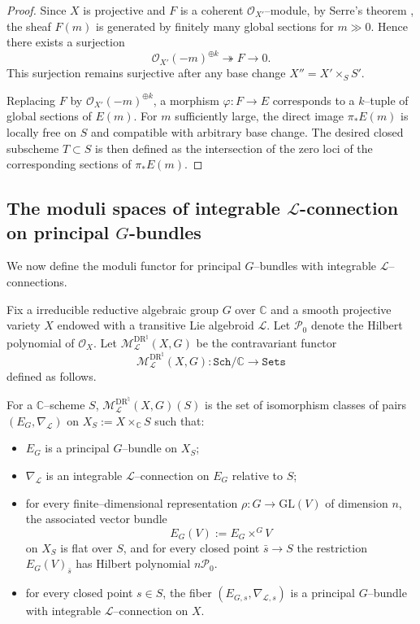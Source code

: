 \documentclass[12pt,reqno]{amsart}
\numberwithin{equation}{subsection}
\theoremstyle{definition}
\theoremstyle{theorem}
\begin{document}
\begin{proof}
	Since $X$ is projective and $F$ is a coherent $\mathcal{O}_{X'}$--module,
	by Serre's theorem \cite[\S\,Ch.~II, Thm.~5.17]{R. Hartshorne-1977},
	the sheaf $F(m)$ is generated by finitely many global sections for $m \gg 0$.
	Hence there exists a surjection
	\[
	\mathcal{O}_{X'}(-m)^{\oplus k} \twoheadrightarrow F \to 0 .
	\]
	This surjection remains surjective after any base change
	$X'' = X' \times_S S'$.
	
	Replacing $F$ by $\mathcal{O}_{X'}(-m)^{\oplus k}$, a morphism
	$\varphi \colon F \to E$ corresponds to a $k$--tuple of global sections of
	$E(m)$.
	For $m$ sufficiently large, the direct image $\pi_*E(m)$ is locally free on $S$
	and compatible with arbitrary base change.
	The desired closed subscheme $T \subset S$ is then defined as the intersection
	of the zero loci of the corresponding sections of $\pi_*E(m)$.
\end{proof}





\subsection{The moduli spaces of integrable $\mathcal{L}$-connection on principal $G$-bundles}\label{susec: moduli space of L connection on PB}

We now define the moduli functor for principal $G$--bundles with integrable
$\mathcal L$--connections.

Fix a irreducible reductive algebraic group $G$ over $\mathbb{C}$ and a smooth projective variety
$X$ endowed with a transitive Lie algebroid $\mathcal L$. Let $\mathcal{P}_{0}$ denote the Hilbert polynomial of $\mathcal{O}_{X}$.
Let $\mathcal{M}^{\text{DR}^{\natural}}_{\mathcal L}(X,G)$ be the contravariant functor
\[
\mathcal{M}^{\text{DR}^{\natural}}_{\mathcal L}(X,G) :
\texttt{Sch}/\mathbb{C} \longrightarrow \texttt{Sets}
\]
defined as follows.

For a $\mathbb{C}$--scheme $S$, $\mathcal{M}^{\text{DR}^{\natural}}_{\mathcal L}(X,G)(S)$
is the set of isomorphism classes of pairs $(E_G,\nabla_{\mathcal L})$ on
$X_S := X \times_{\mathbb{C}} S$ such that:
\begin{itemize}\label{moduli of principal G- bundles with integrable connection}
	\item $E_G$ is a principal $G$--bundle on $X_S$;
	\item $\nabla_{\mathcal L}$ is an integrable $\mathcal L$--connection on
	$E_G$ relative to $S$;
	\item for every finite--dimensional representation
	$\rho : G \to \mathrm{GL}(V)$ of dimension $n$, the associated vector bundle
	\[
	E_G(V) := E_G \times^{G} V
	\]
	on $X_S$ is flat over $S$, and for every closed point
	$\bar{s} \to S$ the restriction $E_G(V)_{\bar{s}}$ has Hilbert polynomial
	$n \mathcal{P}_0$.
	\item for every closed point $s \in S$, the fiber
	$(E_{G,s},\nabla_{\mathcal L,s})$ is a principal
	$G$--bundle with integrable $\mathcal L$--connection on $X$.
\end{itemize}
\end{document}
